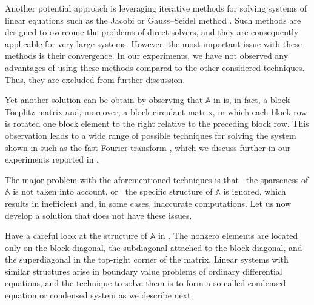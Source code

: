 Another potential approach is leveraging iterative methods for solving systems
of linear equations such as the Jacobi or Gauss--Seidel method \cite{press2007}.
Such methods are designed to overcome the problems of direct solvers, and they
are consequently applicable for very large systems. However, the most important
issue with these methods is their convergence. In our experiments, we have not
observed any advantages of using these methods compared to the other considered
techniques. Thus, they are excluded from further discussion.

Yet another solution can be obtain by observing that $\mathbb{A}$ in
 is, in fact, a block Toeplitz matrix and,
moreover, a block-circulant matrix, in which each block row is rotated one block
element to the right relative to the preceding block row. This observation leads
to a wide range of possible techniques for solving the system shown in
 such as the fast Fourier transform
\cite{mazancourt1983}, which we discuss further in our experiments reported in
.

The major problem with the aforementioned techniques is that \one~the sparseness
of $\mathbb{A}$ is not taken into account, or \two~the specific structure of
$\mathbb{A}$ is ignored, which results in inefficient and, in some cases,
inaccurate computations. Let us now develop a solution that does not have these
issues.

Have a careful look at the structure of $\mathbb{A}$ in
. The nonzero elements are located only on the
block diagonal, the subdiagonal attached to the block diagonal, and the
superdiagonal in the top-right corner of the matrix. Linear systems with similar
structures arise in boundary value problems of ordinary differential equations,
and the technique to solve them is to form a so-called condensed equation or
condensed system \cite{stoer2002} as we describe next.

